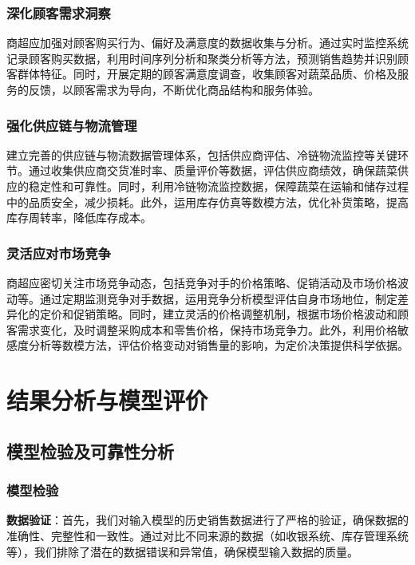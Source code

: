 \documentclass{cumcmthesis}
\begin{document}
\subsubsection{深化顾客需求洞察}

商超应加强对顾客购买行为、偏好及满意度的数据收集与分析。通过实时监控系统记录顾客购买数据，利用时间序列分析和聚类分析等方法，预测销售趋势并识别顾客群体特征。同时，开展定期的顾客满意度调查，收集顾客对蔬菜品质、价格及服务的反馈，以顾客需求为导向，不断优化商品结构和服务体验。

\subsubsection{强化供应链与物流管理}

建立完善的供应链与物流数据管理体系，包括供应商评估、冷链物流监控等关键环节。通过收集供应商交货准时率、质量评价等数据，评估供应商绩效，确保蔬菜供应的稳定性和可靠性。同时，利用冷链物流监控数据，保障蔬菜在运输和储存过程中的品质安全，减少损耗。此外，运用库存仿真等数模方法，优化补货策略，提高库存周转率，降低库存成本。

\subsubsection{灵活应对市场竞争}

商超应密切关注市场竞争动态，包括竞争对手的价格策略、促销活动及市场价格波动等。通过定期监测竞争对手数据，运用竞争分析模型评估自身市场地位，制定差异化的定价和促销策略。同时，建立灵活的价格调整机制，根据市场价格波动和顾客需求变化，及时调整采购成本和零售价格，保持市场竞争力。此外，利用价格敏感度分析等数模方法，评估价格变动对销售量的影响，为定价决策提供科学依据。

\section{结果分析与模型评价}
\subsection{模型检验及可靠性分析}
\subsubsection{模型检验}

\textbf{数据验证}：首先，我们对输入模型的历史销售数据进行了严格的验证，确保数据的准确性、完整性和一致性。通过对比不同来源的数据（如收银系统、库存管理系统等），我们排除了潜在的数据错误和异常值，确保模型输入数据的质量。
\end{document}
